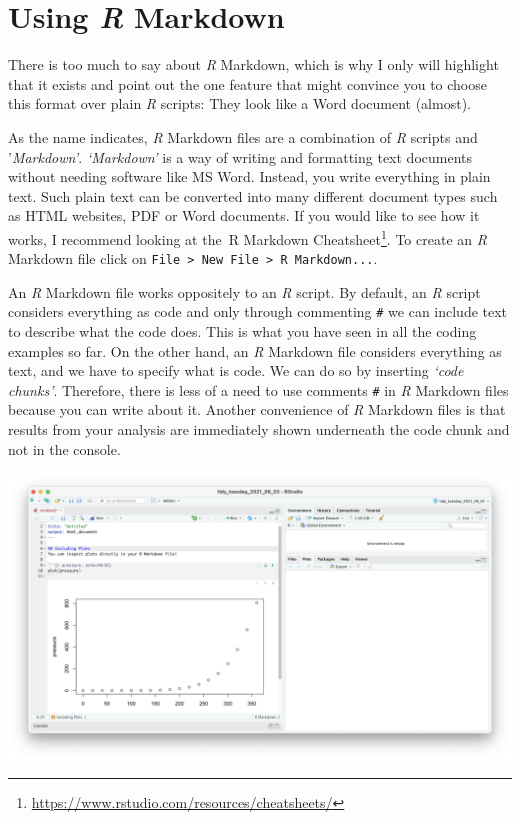 \documentclass[
  letterpaper,
]{krantz}
\renewcommand{\href}[2]{#2\footnote{\url{#1}}}
\begin{document}
\section{\texorpdfstring{Using \emph{R}
Markdown}{Using R Markdown}}\label{sec-r-markdown-and-r-notebooks}

There is too much to say about \emph{R} Markdown, which is why I only
will highlight that it exists and point out the one feature that might
convince you to choose this format over plain \emph{R} scripts: They
look like a Word document (almost).

As the name indicates, \emph{R} Markdown files are a combination of
\emph{R} scripts and '\emph{Markdown'}. \emph{`Markdown'} is a way of
writing and formatting text documents without needing software like MS
Word. Instead, you write everything in plain text. Such plain text can
be converted into many different document types such as HTML websites,
PDF or Word documents. If you would like to see how it works, I
recommend looking at
the~\href{https://www.rstudio.com/resources/cheatsheets/}{R Markdown
Cheatsheet}. To create an \emph{R} Markdown file click on
\texttt{File\ \textgreater{}\ New\ File\ \textgreater{}\ R\ Markdown...}.

An \emph{R} Markdown file works oppositely to an \emph{R} script. By
default, an \emph{R} script considers everything as code and only
through commenting \texttt{\#} we can include text to describe what the
code does. This is what you have seen in all the coding examples so far.
On the other hand, an \emph{R} Markdown file considers everything as
text, and we have to specify what is code. We can do so by inserting
\emph{`code chunks'}. Therefore, there is less of a need to use comments
\texttt{\#} in \emph{R} Markdown files because you can write about it.
Another convenience of \emph{R} Markdown files is that results from your
analysis are immediately shown underneath the code chunk and not in the
console.

\includegraphics{images/chapter_06_img/03_r_markdown/01_r_markdown_plain.png}
\end{document}
